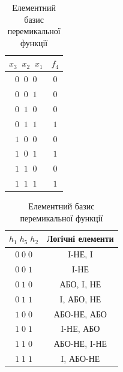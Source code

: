 \documentclass[12pt,a4paper]{article}
\begin{document}
    \begin{table}[h]
        \centering

        \begin{minipage}[t]{0.48\textwidth}
        \centering
        \renewcommand{\arraystretch}{1.2}
        \begin{tabular}{|c|c|}
        \hline
        $x_3\;\;x_2\;\;x_1$ & $f_4$ \\
        \hline
        $0\;\;0\;\;0$ & $0$ \\
        $0\;\;0\;\;1$ & $0$ \\
        $0\;\;1\;\;0$ & $0$ \\
        $0\;\;1\;\;1$ & $1$ \\
        $1\;\;0\;\;0$ & $0$ \\
        $1\;\;0\;\;1$ & $1$ \\
        $1\;\;1\;\;0$ & $0$ \\
        $1\;\;1\;\;1$ & $1$ \\
        \hline
        \end{tabular}
        \caption{Таблиця істинності функції $f_4$}
        \end{minipage}
        \hfill
        \begin{minipage}[t]{0.48\textwidth}
        \centering
        \renewcommand{\arraystretch}{1.4}
        \begin{tabular}{|c|c|}
        \hline
        \textbf{$h_1\;h_5\;h_2$} & \textbf{Логічні елементи} \\
        \hline
        $0\;0\;0$ & I-НЕ, I \\
        \hline
        \rowcolor{yellow!35}
        $0\;0\;1$ & I-НЕ \\
        \hline
        $0\;1\;0$ & АБО, I, НЕ \\
        \hline
        $0\;1\;1$ & I, АБО, НЕ \\
        \hline
        $1\;0\;0$ & АБО-НЕ, АБО \\
        \hline
        $1\;0\;1$ & I-НЕ, АБО \\
        \hline
        $1\;1\;0$ & АБО-НЕ, I-НЕ \\
        \hline
        $1\;1\;1$ & I, АБО-НЕ \\
        \hline
        \end{tabular}
        \caption{Елементний базис перемикальної функції}
        \end{minipage}

    \end{table}
\end{document}
